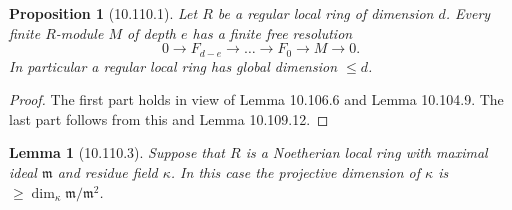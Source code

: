 \documentclass[UTF8,11pt]{ctexart}
\newtheorem*{lemma}{Lemma}
\newtheorem*{proposition}{Proposition}
\theoremstyle{definition}
\begin{document}
\begin{proposition}[10.110.1]
Let $R$ be a regular local ring of dimension $d$. Every finite $R$-module $M$ of depth $e$ has a finite free resolution
\[
0\to F_{d-e}\to\ldots\to F_0\to M\to0.
\]
In particular a regular local ring has global dimension $\leq d$.
\end{proposition}
\begin{proof}
The first part holds in view of Lemma 10.106.6 and Lemma 10.104.9. The last part follows from this and Lemma 10.109.12.
\end{proof}
\begin{lemma}[10.110.3]
Suppose that $R$ is a Noetherian local ring with maximal ideal $\mathfrak m$ and residue field $\kappa$. In this case the projective dimension of $\kappa$ is $\geq\dim_\kappa\mathfrak m/\mathfrak m^2$.
\end{lemma}
\end{document}
